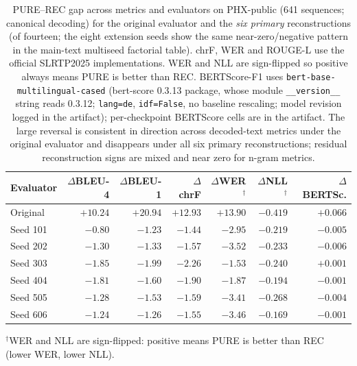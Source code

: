 \documentclass[pdflatex,sn-chicago]{sn-jnl}
\begin{document}
\begin{table}[h]
\centering
\scriptsize\setlength{\tabcolsep}{3pt}
\caption{PURE--REC gap across metrics and evaluators on PHX-public (641 sequences; canonical decoding) for the original evaluator and the \emph{six primary} reconstructions (of fourteen; the eight extension seeds show the same near-zero/negative pattern in the main-text multiseed factorial table). chrF, WER and ROUGE-L use the official SLRTP2025 implementations. WER and NLL are sign-flipped so positive always means PURE is better than REC. BERTScore-F1 uses \texttt{bert-base-multilingual-cased} (bert-score 0.3.13 package, whose module \texttt{\_\_version\_\_} string reads 0.3.12; \texttt{lang=de}, \texttt{idf=False}, no baseline rescaling; model revision logged in the artifact); per-checkpoint BERTScore cells are in the artifact. The large reversal is consistent in direction across decoded-text metrics under the original evaluator and disappears under all six primary reconstructions; residual reconstruction signs are mixed and near zero for n-gram metrics.}
\label{tab:s3_cross_metric_gap}
\begin{tabular}{lrrrrrr}
\toprule
Evaluator & $\Delta$BLEU-4 & $\Delta$BLEU-1 & $\Delta$chrF & $\Delta$WER$^\dagger$ & $\Delta$NLL$^\dagger$ & $\Delta$BERTSc. \\
\midrule
Original & $+10.24$ & $+20.94$ & $+12.93$ & $+13.90$ & $-0.419$ & $+0.066$ \\
Seed 101 & $-0.80$ & $-1.23$ & $-1.44$ & $-2.95$ & $-0.219$ & $-0.005$ \\
Seed 202 & $-1.30$ & $-1.33$ & $-1.57$ & $-3.52$ & $-0.233$ & $-0.006$ \\
Seed 303 & $-1.85$ & $-1.99$ & $-2.26$ & $-1.53$ & $-0.240$ & $+0.001$ \\
Seed 404 & $-1.81$ & $-1.60$ & $-1.90$ & $-1.87$ & $-0.194$ & $-0.001$ \\
Seed 505 & $-1.28$ & $-1.53$ & $-1.59$ & $-3.41$ & $-0.268$ & $-0.004$ \\
Seed 606 & $-1.24$ & $-1.26$ & $-1.55$ & $-3.46$ & $-0.169$ & $-0.001$ \\
\bottomrule
\end{tabular}
\par\smallskip
\footnotesize $^\dagger$WER and NLL are sign-flipped: positive means PURE is better than REC (lower WER, lower NLL).
\end{table}
\end{document}
